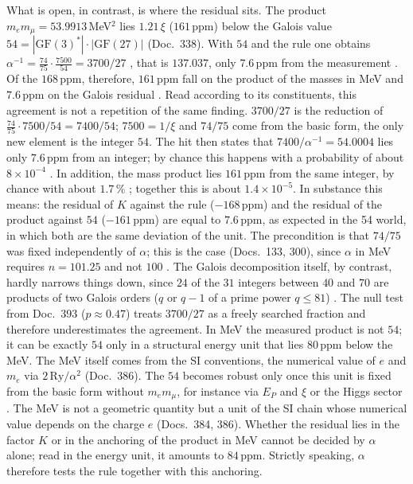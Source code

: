What is open, in contrast, is where the residual sits. The product $m_em_\mu=53.9913$\,MeV$^2$ lies
$1.21\,\xi$ ($161$\,ppm) below the Galois value $54=|\mathrm{GF}(3)^*|\cdot|\mathrm{GF}(27)|$
(Doc.~338). With $54$ and the rule one obtains
$\alpha^{-1}=\tfrac{74}{75}\cdot\tfrac{7500}{54}=3700/27$ \BM, that is $137.037$, only $7.6$\,ppm
from the measurement \KM. Of the $168$\,ppm, therefore, $161$\,ppm fall on the product of the masses in MeV
and $7.6$\,ppm on the Galois residual \KM. Read according to its constituents, this agreement is not a
repetition of the same finding. $3700/27$ is the reduction of $\tfrac{74}{75}\cdot7500/54=7400/54$;
$7500=1/\xi$ and $74/75$ come from the basic form, the only new element is the integer $54$. The hit
then states that $7400/\alpha^{-1}=54.0004$ lies only $7.6$\,ppm from an integer; by chance this
happens with a probability of about $8\times10^{-4}$ \KM. In addition, the mass product lies
$161$\,ppm from the same integer, by chance with about $1.7\,\%$ \KM; together this is about
$1.4\times10^{-5}$. In substance this means: the residual of $K$ against the rule ($-168$\,ppm) and
the residual of the product against $54$ ($-161$\,ppm) are equal to $7.6$\,ppm, as expected in the
54 world, in which both are the same deviation of the unit. The precondition is that $74/75$ was fixed
independently of $\alpha$; this is the case (Docs.~133, 300), since $\alpha$ in MeV requires
$n=101.25$ and not $100$ \SM. The Galois decomposition itself, by contrast, hardly narrows things
down, since $24$ of the $31$ integers between $40$ and $70$ are products of two Galois orders ($q$ or
$q-1$ of a prime power $q\le81$) \KM. The null test from Doc.~393 ($p\approx0.47$) treats $3700/27$
as a freely searched fraction and therefore underestimates the agreement. In MeV the measured product is not $54$; it can be exactly $54$ only in a structural energy unit
that lies $80$\,ppm below the MeV. The MeV itself comes from the SI conventions, the numerical value
of $e$ and $m_e$ via $2\,\mathrm{Ry}/\alpha^2$ (Doc.~386). The $54$ becomes robust only once this
unit is fixed from the basic form without $m_em_\mu$, for instance via $E_P$ and $\xi$ or the Higgs
sector \SM. The MeV is not a geometric quantity but a unit of the SI
chain whose numerical value depends on the charge $e$ (Docs.~384, 386). Whether the residual lies in
the factor $K$ or in the anchoring of the product in MeV cannot be decided by $\alpha$ alone; read in
the energy unit, it amounts to $84$\,ppm. Strictly speaking, $\alpha$ therefore tests the rule
together with this anchoring.

